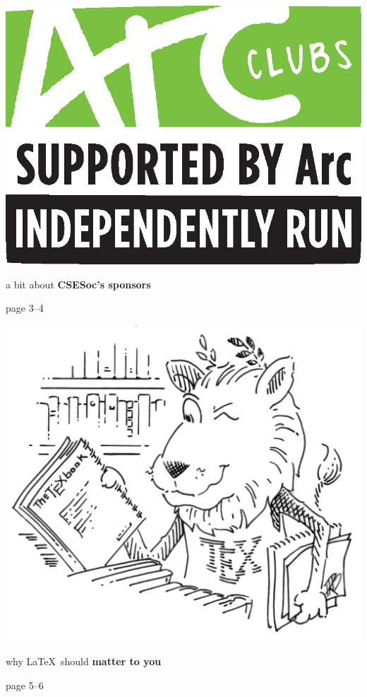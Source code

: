 \documentclass[twoside]{article}
\begin{document}
\begin{multicols}{2}\center\vspace*{3ex}
\includegraphics[width=.9\linewidth]{../../sponsors/arcunsw.eps}

{\sffamily\fontsize{24pt}{24pt}\selectfont a bit about \bfseries CSESoc's sponsors}

{\rmfamily\fontsize{14pt}{14pt}\selectfont page 3--4}

\endcenter\columnbreak\center
\includegraphics[width=.9\linewidth]{images/ctan_lion_600.png}\vfill

{\sffamily\fontsize{24pt}{24pt}\selectfont why \LaTeX\ should \bfseries matter to you}

{\rmfamily\fontsize{14pt}{14pt}\selectfont page 5--6}

\endcenter\end{multicols}
\end{document}
